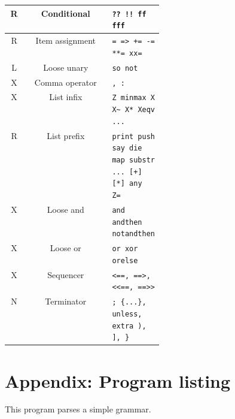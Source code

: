 \documentclass[17pt,english]{extarticle}
\providecommand{\tabularnewline}{\\}
\begin{document}
\begin{longtable}{|c|c|>{\centering}p{0.3\linewidth}|}
\hline 
{\small{}R} &
{\small{}Conditional } &
\texttt{\small{}?? !! ff fff}\tabularnewline
\hline 
{\small{}R} &
{\small{}Item assignment } &
\texttt{\small{}= => += -= {*}{*}= xx=}\tabularnewline
\hline 
{\small{}L} &
{\small{}Loose unary } &
\texttt{\small{}so not}\tabularnewline
\hline 
{\small{}X} &
{\small{}Comma operator } &
\texttt{\small{}, :}\tabularnewline
\hline 
{\small{}X} &
{\small{}List infix } &
\texttt{\small{}Z minmax X X\textasciitilde{} X{*} Xeqv ...}\tabularnewline
\hline 
{\small{}R} &
{\small{}List prefix } &
\texttt{\small{}print push say die map substr ... {[}+{]} {[}{*}{]}
any Z=}\tabularnewline
\hline 
{\small{}X} &
{\small{}Loose and } &
\texttt{\small{}and andthen notandthen}\tabularnewline
\hline 
{\small{}X} &
{\small{}Loose or } &
\texttt{\small{}or xor orelse}\tabularnewline
\hline 
{\small{}X} &
{\small{}Sequencer } &
\texttt{\small{}<==, ==>, <\textcompwordmark{}<==, ==>\textcompwordmark{}>}\tabularnewline
\hline 
{\small{}N} &
{\small{}Terminator } &
\texttt{\small{}; \{...\}, unless, extra ), {]}, \}}\tabularnewline
\hline 
\end{longtable}{\scriptsize \par}


\part*{Appendix: Program listing}

This program parses a simple grammar.
\end{document}

